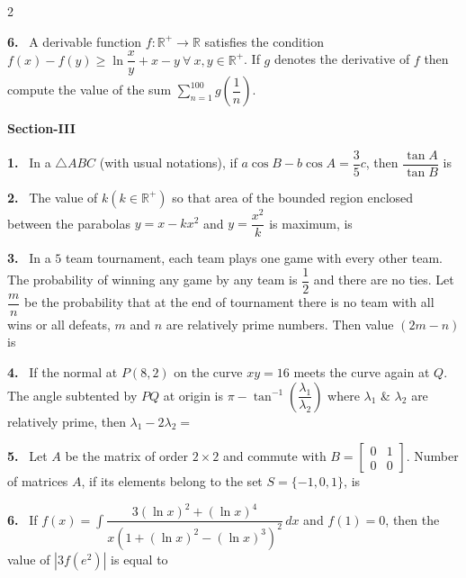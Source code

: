 \documentclass[10pt]{extarticle}
\newcommand{\sect}[1]{\par\smallskip\noindent\textbf{#1}\par}
\newcommand{\qn}[1]{\par\smallskip\noindent\textbf{#1.}~}
\begin{document}
\begin{multicols}{2}
\qn{6} A derivable function $f:\mathbb R^+\to\mathbb R$ satisfies the condition $f(x)-f(y)\ge\ln\dfrac xy+x-y\ \forall\ x,y\in\mathbb R^+$. If $g$ denotes the derivative of $f$ then compute the value of the sum $\displaystyle\sum_{n=1}^{100}g\!\left(\dfrac1n\right)$.
\sect{Section-III}
\qn{1} In a $\triangle ABC$ (with usual notations), if $a\cos B-b\cos A=\dfrac35c$, then $\dfrac{\tan A}{\tan B}$ is
\qn{2} The value of $k(k\in\mathbb R^+)$ so that area of the bounded region enclosed between the parabolas $y=x-kx^2$ and $y=\dfrac{x^2}{k}$ is maximum, is
\qn{3} In a $5$ team tournament, each team plays one game with every other team. The probability of winning any game by any team is $\dfrac12$ and there are no ties. Let $\dfrac mn$ be the probability that at the end of tournament there is no team with all wins or all defeats, $m$ and $n$ are relatively prime numbers. Then value $(2m-n)$ is
\qn{4} If the normal at $P(8,2)$ on the curve $xy=16$ meets the curve again at $Q$. The angle subtented by $PQ$ at origin is $\pi-\tan^{-1}\!\left(\dfrac{\lambda_1}{\lambda_2}\right)$ where $\lambda_1$ \& $\lambda_2$ are relatively prime, then $\lambda_1-2\lambda_2=$
\qn{5} Let $A$ be the matrix of order $2\times2$ and commute with $B=\begin{bmatrix}0&1\\0&0\end{bmatrix}$. Number of matrices $A$, if its elements belong to the set $S=\{-1,0,1\}$, is
\qn{6} If $f(x)=\displaystyle\int\dfrac{3(\ln x)^2+(\ln x)^4}{x\left(1+(\ln x)^2-(\ln x)^3\right)^2}\,dx$ and $f(1)=0$, then the value of $|3f(e^2)|$ is equal to
\end{multicols}
\end{document}
